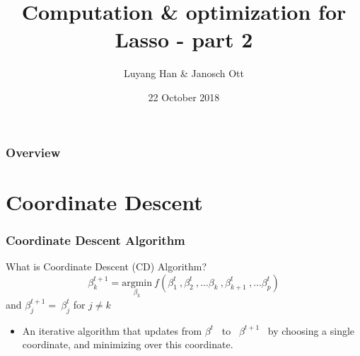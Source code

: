 \documentclass{beamer}
\title[Computation \& optimization]{Computation \& optimization for Lasso - part 2} %
\author{Luyang Han \& Janosch Ott} %
\institute[] %
{
ETH Zürich \\ %
}
\date{22 October 2018} %
\begin{document}
\begin{frame}
\titlepage %
\end{frame}

\begin{frame}
\frametitle{Overview} %
\tableofcontents %
\end{frame}



\section{Coordinate Descent}
\begin{frame}
\frametitle{Coordinate Descent Algorithm}
\begin{block}{What is Coordinate Descent (CD) Algorithm?}
\begin{equation}    %
            \beta^{t+1}_{k} = \underset{\beta_k}{\mathrm{argmin}}\ f(\beta^{t}_{1}\ ,\beta^{t}_{2}\ ,...\beta_{k}\ ,\beta^{t}_{k+1}\ , ...\beta^{t}_{p})
    \end{equation}
    \; and $\beta^{t+1}_j =\ \beta^{t}_j$ for $j \neq k$
    \vspace*{6mm}
\begin{itemize}
\item  An iterative algorithm that updates from $\beta^t$ \ to \   $\beta^{t+1}$ \  by choosing a single coordinate, and minimizing over this coordinate.
\end{itemize}
\end{block}
\end{frame}
\end{document}

